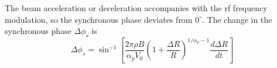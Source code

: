 \begin{itemize}
The beam acceleration or deceleration accompanies with the rf frequency modulation, so the synchronous phase deviates from $0^\circ$. The change in the synchronous phase $\Delta\phi_{s}$ is ~\cite{ezura_beam-dynamics_2008}
%
%
%
\begin{equation}
\Delta \phi_{s}=\sin^{-1}[{\frac{2\pi \rho B}{\alpha_pV_0}(1+\frac{\Delta R}{R})^{1/\alpha_p-1}\frac{d\Delta R}{dt}}]
\label{eq:delta_phase}
\end{equation} 




\end{itemize}
